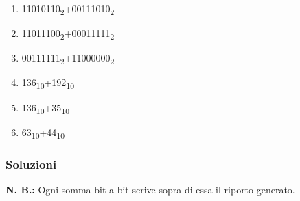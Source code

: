 \documentclass{article}
\begin{document}
\begin{enumerate}
    \item 11010110\textsubscript{2}+00111010\textsubscript{2}
    \item 11011100\textsubscript{2}+00011111\textsubscript{2}
    \item 00111111\textsubscript{2}+11000000\textsubscript{2}
    \item 136\textsubscript{10}+192\textsubscript{10}
    \item 136\textsubscript{10}+35\textsubscript{10}
    \item 63\textsubscript{10}+44\textsubscript{10}
\end{enumerate}


\subsubsection*{Soluzioni}
\textbf{N. B.:} Ogni somma bit a bit scrive sopra di essa il riporto generato.
\end{document}
